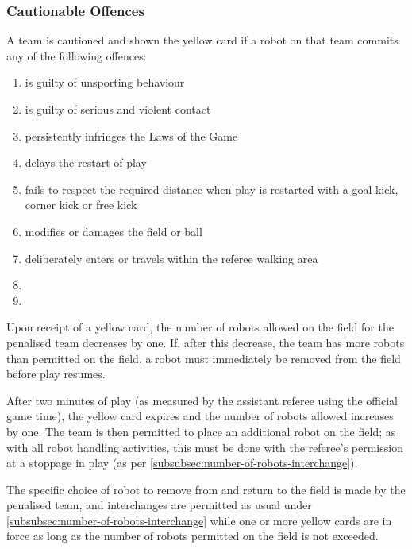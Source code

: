 \subsubsection{Cautionable Offences}
A team is cautioned and shown the yellow card if a robot on that team commits any of the following  offences:
\begin{enumerate}
\item is guilty of unsporting behaviour
\item is guilty of serious and violent contact
\item persistently infringes the Laws of the Game
\item delays the restart of play
\item fails to respect the required distance when play is restarted with a goal kick, corner kick or free kick
\item modifies or damages the field or ball
\item deliberately enters or travels within the referee walking area
\item {}
\item {}
\end{enumerate}

Upon receipt of a yellow card, the number of robots allowed on the field for the penalised team decreases by one.
If, after this decrease, the team has more robots than permitted on the field, a robot must immediately be removed from the field before play resumes.

After two minutes of play (as measured by the assistant referee using the official game time), the yellow card expires and the number of robots allowed increases by one.
The team is then permitted to place an additional robot on the field; as with all robot handling activities, this must be done with the referee's permission at a stoppage in play (as per \autoref{subsubsec:number-of-robots-interchange}).

The specific choice of robot to remove from and return to the field is made by the penalised team, and interchanges are permitted as usual under \autoref{subsubsec:number-of-robots-interchange} while one or more yellow cards are in force as long as the number of robots permitted on the field is not exceeded.

